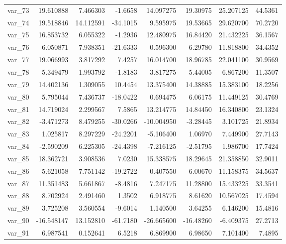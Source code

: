 ﻿\documentclass[12pt]{article}
\begin{document}
\begin{longtable}{lrrrrrrr}
  var\_73 &  19.610888 &   7.466303 &  -1.6658 &  14.097275 &  19.30975 &  25.207125 &  44.5361 \\
  var\_74 &  19.518846 &  14.112591 & -34.1015 &   9.595975 &  19.53665 &  29.620700 &  70.2720 \\
  var\_75 &  16.853732 &   6.055322 &  -1.2936 &  12.480975 &  16.84420 &  21.432225 &  36.1567 \\
  var\_76 &   6.050871 &   7.938351 & -21.6333 &   0.596300 &   6.29780 &  11.818800 &  34.4352 \\
  var\_77 &  19.066993 &   3.817292 &   7.4257 &  16.014700 &  18.96785 &  22.041100 &  30.9569 \\
  var\_78 &   5.349479 &   1.993792 &  -1.8183 &   3.817275 &   5.44005 &   6.867200 &  11.3507 \\
  var\_79 &  14.402136 &   1.309055 &  10.4454 &  13.375400 &  14.38885 &  15.383100 &  18.2256 \\
  var\_80 &   5.795044 &   7.436737 & -18.0422 &   0.694475 &   6.06175 &  11.449125 &  30.4769 \\
  var\_81 &  14.719024 &   2.299567 &   7.5865 &  13.214775 &  14.84450 &  16.340800 &  23.1324 \\
  var\_82 &  -3.471273 &   8.479255 & -30.0266 & -10.004950 &  -3.28445 &   3.101725 &  21.8934 \\
  var\_83 &   1.025817 &   8.297229 & -24.2201 &  -5.106400 &   1.06970 &   7.449900 &  27.7143 \\
  var\_84 &  -2.590209 &   6.225305 & -24.4398 &  -7.216125 &  -2.51795 &   1.986700 &  17.7424 \\
  var\_85 &  18.362721 &   3.908536 &   7.0230 &  15.338575 &  18.29645 &  21.358850 &  32.9011 \\
  var\_86 &   5.621058 &   7.751142 & -19.2722 &   0.407550 &   6.00670 &  11.158375 &  34.5637 \\
  var\_87 &  11.351483 &   5.661867 &  -8.4816 &   7.247175 &  11.28800 &  15.433225 &  33.3541 \\
  var\_88 &   8.702924 &   2.491460 &   1.3502 &   6.918775 &   8.61620 &  10.567025 &  17.4594 \\
  var\_89 &   3.725208 &   3.560554 &  -9.6014 &   1.140500 &   3.64255 &   6.146200 &  15.4816 \\
  var\_90 & -16.548147 &  13.152810 & -61.7180 & -26.665600 & -16.48260 &  -6.409375 &  27.2713 \\
  var\_91 &   6.987541 &   0.152641 &   6.5218 &   6.869900 &   6.98650 &   7.101400 &   7.4895 \\

\end{longtable}
\end{document}
